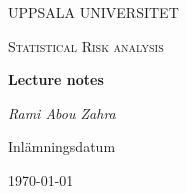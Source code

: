 \begin{titlepage}

  \centering
	{\scshape\LARGE UPPSALA UNIVERSITET\par}
	\vspace{1cm}
  {\scshape\Large {Statistical Risk analysis} \par}
	\vspace{1.5cm}
  {\huge\bfseries {Lecture notes} \par}
	\vspace{2cm}
	{\Large\itshape Rami Abou Zahra \par}
	\vfill
  \vfill


  {\large Inlämningsdatum}\par
  {\today}

\end{titlepage}
